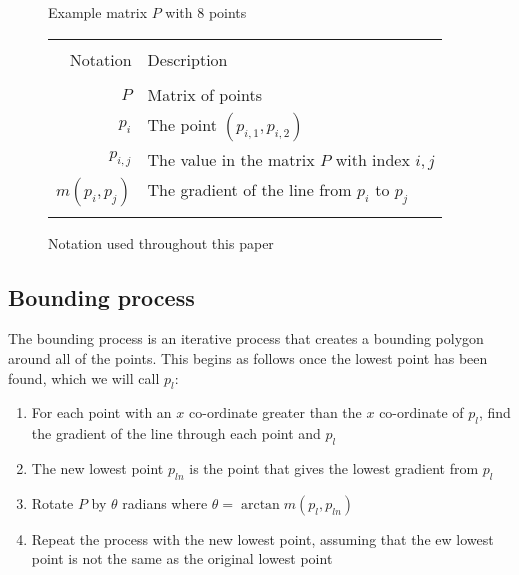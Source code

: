 \documentclass[11pt]{article}
\begin{document}
\begin{figure}[t]
\begin{center}
\end{center}
	\caption{Example matrix $P$ with 8 points}\label{plt:example}
\end{figure}

\begin{figure}[h!]
	\begin{center}
	\begin{tabu}{r|p{7cm}}
		\tabucline[2pt]\\Notation & Description \\
		\tabucline[1pt]\\
		$P$ & Matrix of points \\\hline
		$p_i$ & The point $(p_{i,1},p_{i,2})$ \\\hline
		$p_{i,j}$ & The value in the matrix $P$ with index $i,j$ \\\hline
		$m(p_i,p_j)$ & The gradient of the line from $p_i$ to $p_j$ \\\hline
		\tabucline[2pt]\\
	\end{tabu}
	\end{center}
	\caption{Notation used throughout this paper}
\end{figure}

\subsection{Bounding process}
The bounding process is an iterative process that creates a bounding polygon around all of the points. This begins as follows once the lowest point has been found, which we will call $p_l$:
\begin{enumerate}
	\item For each point with an $x$ co-ordinate greater than the $x$ co-ordinate of $p_l$, find the gradient of the line through each point and $p_l$
	\item The new lowest point $p_{ln}$ is the point that gives the lowest gradient from $p_l$
	\item Rotate $P$ by $\theta$ radians where $\theta=\arctan m(p_l,p_{ln})$
	\item Repeat the process with the new lowest point, assuming that the ew lowest point is not the same as the original lowest point
\end{enumerate}
\end{document}
